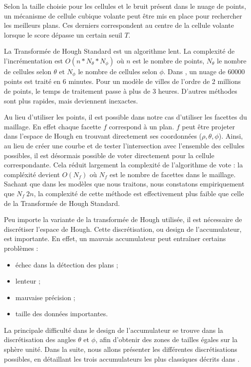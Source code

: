 ﻿\documentclass[12pt, twoside]{article}
\begin{document}
Selon la taille choisie pour les cellules et le bruit présent dans le nuage de points, un mécanisme de cellule cubique volante peut être mis en place pour rechercher les meilleurs plans. Ces derniers correspondent au centre de la cellule volante lorsque le score dépasse un certain seuil $T$.

La Transformée de Hough Standard est un algorithme lent. La complexité de l'incrémentation est $O(n*N_{\theta}*N_{\phi})$ où $n$ est le nombre de points, $N_{\theta}$ le nombre de cellules selon $\theta$ et $N_{\phi}$ le nombre de cellules selon $\phi$. Dans \cite{Hough1}, un nuage de 60000 points est traité en 6 minutes. Pour un modèle de villes de l'ordre de 2 millions de points, le temps de traitement passe à plus de 3 heures. D'autres méthodes sont plus rapides, mais deviennent inexactes.

Au lieu d'utiliser les points, il est possible dans notre cas d'utiliser les facettes du maillage. En effet chaque facette $f$ correspond à un plan. $f$ peut être projeter dans l'espace de Hough en trouvant directement ses coordonnées ($\rho, \theta, \phi$). Ainsi, au lieu de créer une courbe et de tester l'intersection avec l'ensemble des cellules possibles, il est désormais possible de voter directement pour la cellule correspondante. Cela réduit largement la complexité de l'algorithme de vote : la compléxité devient $O(N_f)$ où $N_f$ est le nombre de facettes dans le maillage. Sachant que dans les modèles que nous traitons, nous constatons empiriquement que $N_f ~ 2n$, la complexité de cette méthode est effectivement plus faible que celle de la Transformée de Hough Standard.

Peu importe la variante de la transformée de Hough utilisée, il est nécessaire de discrétiser l'espace de Hough. Cette discrétisation, ou design de l'accumulateur, est importante. En effet, un mauvais accumulateur peut entraîner certains problèmes :
\begin{itemize}
  \item échec dans la détection des plans ;
  \item lenteur ;
  \item mauvaise précision ;
  \item taille des données importantes.
\end{itemize}
La principale difficulté dans le design de l'accumulateur se trouve dans la discrétisation des angles $\theta$ et $\phi$, afin d'obtenir des zones de tailles égales sur la sphère unité. Dans la suite, nous allons présenter les différentes discrétisations possibles, en détaillant les trois accumulateurs les plus classiques décrits dans \cite{Hough2}.
\end{document}
